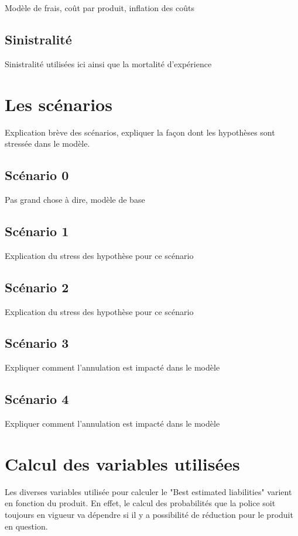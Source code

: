 \documentclass{article}
\begin{document}
Modèle de frais, coût par produit, inflation des coûts

\subsection{Sinistralité}

Sinistralité utilisées ici ainsi que la mortalité d'expérience


\newpage
\section{Les scénarios}
Explication brève des scénarios, expliquer la façon dont les hypothèses sont stressée dans le modèle.

\subsection{Scénario 0}
Pas grand chose à dire, modèle de base

\subsection{Scénario 1}
Explication du stress des hypothèse pour ce scénario

\subsection{Scénario 2}
Explication du stress des hypothèse pour ce scénario

\subsection{Scénario 3}
Expliquer comment l'annulation est impacté dans le modèle

\subsection{Scénario 4}
Expliquer comment l'annulation est impacté dans le modèle


\newpage
\section{Calcul des variables utilisées}

Les diverses variables utilisée pour calculer le "Best estimated liabilities" varient en fonction du produit. En effet, le calcul des probabilités que la police soit toujours en vigueur va dépendre si il y a possibilité de réduction pour le produit en question.\\
\end{document}
